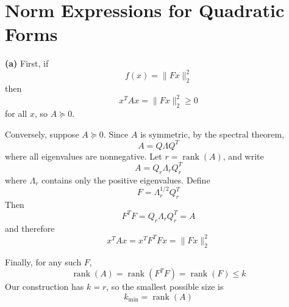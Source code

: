 \section{Norm Expressions for Quadratic Forms}




\textbf{(a)}
First, if
\[
f(x)=\|Fx\|_2^2
\]
then
\[
x^TAx=\|Fx\|_2^2\geq 0
\]
for all \(x\), so \(A\succeq0\).

Conversely, suppose \(A\succeq0\). Since \(A\) is symmetric, by the spectral
theorem,
\[
A=Q\Lambda Q^T
\]
where all eigenvalues are nonnegative. Let \(r=\operatorname{rank}(A)\), and
write
\[
A=Q_r\Lambda_rQ_r^T
\]
where \(\Lambda_r\) contains only the positive eigenvalues. Define
\[
F=\Lambda_r^{1/2}Q_r^T
\]
Then
\[
F^TF=Q_r\Lambda_rQ_r^T=A
\]
and therefore
\[
x^TAx=x^TF^TFx=\|Fx\|_2^2
\]

Finally, for any such \(F\),
\[
\operatorname{rank}(A)
=\operatorname{rank}(F^TF)
=\operatorname{rank}(F)
\leq k
\]
Our construction has \(k=r\), so the smallest possible size is
\[
\boxed{k_{\min}=\operatorname{rank}(A)}
\]

